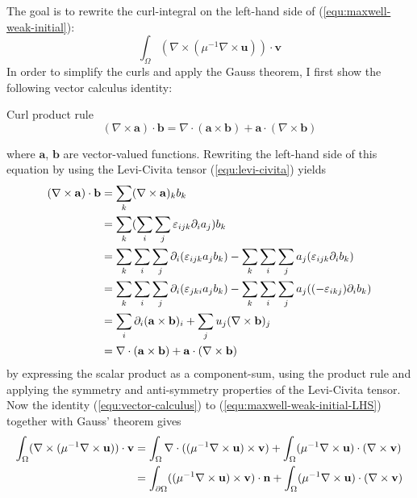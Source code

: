 \documentclass[11pt, a4paper]{article}
\begin{document}
The goal is to rewrite the curl-integral on the left-hand side of 
(\ref{equ:maxwell-weak-initial}):
\begin{equation}
    \int_{\Omega} (\nabla \times (\mu^{-1} \nabla \times \mathbf{u})) \cdot \mathbf{v} \label{equ:maxwell-weak-initial-LHS}
\end{equation}
In order to simplify the curls and apply the Gauss theorem, I first show
the following vector calculus identity:
\begin{fancybox}{Curl product rule}
    \begin{equation}
        (\nabla \times \mathbf{a}) \cdot \mathbf{b} = \nabla \cdot (\mathbf{a} \times \mathbf{b}) + \mathbf{a} \cdot (\nabla \times \mathbf{b}) \label{equ:vector-calculus}
    \end{equation}
\end{fancybox}
where $\mathbf{a}$, $\mathbf{b}$ are vector-valued functions. Rewriting the 
left-hand side of this equation by using the Levi-Civita tensor (\ref{equ:levi-civita})
yields
\begin{align}
    (\nabla \times \mathbf{a}) \cdot \mathbf{b} &= \sum_k (\nabla \times \mathbf{a})_k b_k \notag \\ 
    &= \sum_k (\sum_i \sum_j \varepsilon_{ijk} \partial_i a_j) b_k \notag \\ 
    &= \sum_k \sum_i \sum_j \partial_i (\varepsilon_{ijk} a_j b_k) - \sum_k \sum_i \sum_j a_j (\varepsilon_{ijk} \partial_i b_k) \notag \\ 
    &= \sum_k \sum_i \sum_j \partial_i (\varepsilon_{jki} a_j b_k) - \sum_k \sum_i \sum_j a_j ((-\varepsilon_{ikj}) \partial_i b_k) \notag \\ 
    &= \sum_i \partial_i (\mathbf{a} \times \mathbf{b})_i + \sum_j u_j (\nabla \times \mathbf{b})_j \notag \\ 
    &= \nabla \cdot (\mathbf{a} \times \mathbf{b}) + \mathbf{a} \cdot (\nabla \times \mathbf{b}) \label{equ:curlidentity} 
\end{align}
by expressing the scalar product as a component-sum, using the product rule and
applying the symmetry and anti-symmetry properties of the Levi-Civita tensor.
Now the identity (\ref{equ:vector-calculus}) to (\ref{equ:maxwell-weak-initial-LHS})
together with Gauss' theorem gives
\begin{align}
    \int_{\Omega} (\nabla \times ({\mu^{-1} \nabla \times \mathbf{u}})) \cdot \mathbf{v} &=
    \int_{\Omega} \nabla \cdot (({\mu^{-1} \nabla \times \mathbf{u}}) \times \mathbf{v})
    + \int_{\Omega} ({\mu^{-1} \nabla \times \mathbf{u}}) \cdot (\nabla \times \mathbf{v}) \notag \\
    &= \int_{\partial \Omega} (({\mu^{-1} \nabla \times \mathbf{u}}) \times \mathbf{v}) \cdot \mathbf{n}
    + \int_{\Omega} ({\mu^{-1} \nabla \times \mathbf{u}}) \cdot (\nabla \times \mathbf{v}) \notag \\
\end{align}
\end{document}
